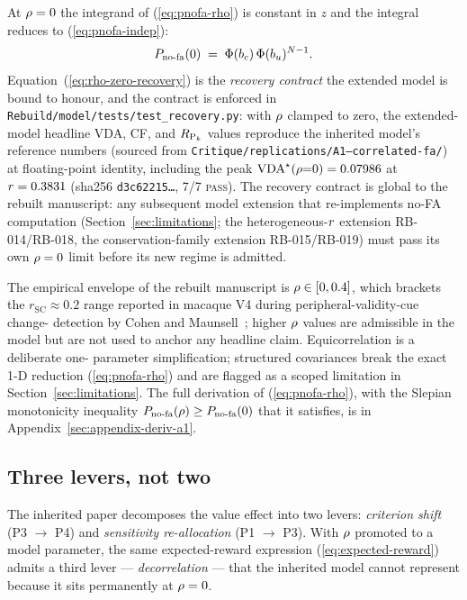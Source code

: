 At $\rho = 0$ the integrand of (\ref{eq:pnofa-rho}) is constant in
$z$ and the integral reduces to (\ref{eq:pnofa-indep}):
\begin{equation}
  P_{\mathrm{no\text{-}fa}}(0) \;=\;
  \Phi(b_c)\,\Phi(b_u)^{N - 1}.
  \label{eq:rho-zero-recovery}
\end{equation}
Equation~(\ref{eq:rho-zero-recovery}) is the \emph{recovery contract}
the extended model is bound to honour, and the contract is enforced
in \texttt{Rebuild/model/tests/test\_recovery.py}: with $\rho$
clamped to zero, the extended-model headline VDA, CF, and
$R_{\text{P}_k}$ values reproduce the inherited model's reference
numbers (sourced from
\texttt{Critique/replications/A1--correlated-fa/}) at floating-point
identity, including the peak
$\mathrm{VDA}^{\star}(\rho{=}0) = 0.07986$ at $r = 0.3831$
(sha256 \texttt{d3c62215\ldots}, 7/7 \textsc{pass}). The recovery
contract is global to the rebuilt manuscript: any subsequent model
extension that re-implements no-FA computation
(Section~\ref{sec:limitations}; the heterogeneous-$r$ extension
RB-014/RB-018, the conservation-family extension RB-015/RB-019) must
pass its own $\rho = 0$ limit before its new regime is admitted.

The empirical envelope of the rebuilt manuscript is
$\rho \in [0, 0.4]$, which brackets the $r_\mathrm{SC} \approx 0.2$
range reported in macaque V4 during peripheral-validity-cue change-
detection by Cohen and Maunsell~\cite{CohenMaunsell2009}; higher
$\rho$ values are admissible in the model but are not used to
anchor any headline claim. Equicorrelation is a deliberate one-
parameter simplification; structured covariances
\cite{RuffCohen2016, Srinath2021} break the exact 1-D reduction
(\ref{eq:pnofa-rho}) and are flagged as a scoped limitation in
Section~\ref{sec:limitations}. The full derivation of
(\ref{eq:pnofa-rho}), with the Slepian monotonicity inequality
$P_{\mathrm{no\text{-}fa}}(\rho) \ge P_{\mathrm{no\text{-}fa}}(0)$ \cite{Slepian1962} that it satisfies,
is in Appendix~\ref{sec:appendix-deriv-a1}.

\subsection{Three levers, not two}
\label{sec:model-three-levers}

The inherited paper decomposes the value effect into two levers:
\emph{criterion shift} (P3 $\to$ P4) and \emph{sensitivity
re-allocation} (P1 $\to$ P3). With $\rho$ promoted to a model
parameter, the same expected-reward expression
(\ref{eq:expected-reward}) admits a third lever — \emph{decorrelation}
— that the inherited model cannot represent because it sits
permanently at $\rho = 0$.

